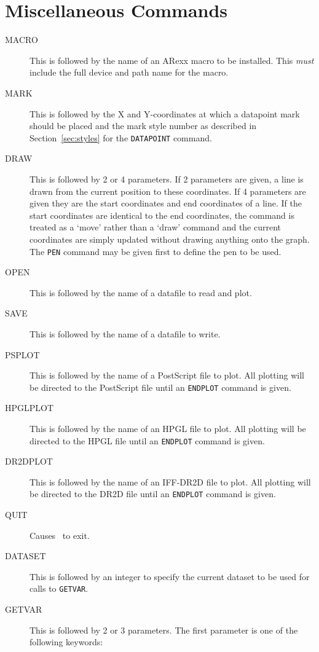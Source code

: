 \section{Miscellaneous Commands}
\begin{description}
\item[MACRO\ddag] This is followed by the name of an ARexx macro to be installed.
This {\em must\/} include the full device and path name for the macro.
\item[MARK\dag] This is followed by the X and Y-coordinates at which a datapoint mark 
should be placed and the mark style number as described in Section~\ref{sec:styles} 
for the {\tt DATAPOINT} command.
\item[DRAW\dag] This is followed by 2 or 4 parameters. If 2 parameters are given,
a line is 
drawn from the current position to these coordinates. If 4 parameters are given they 
are the start coordinates and end coordinates of a line. If the start coordinates 
are identical to the end coordinates, the command is treated as a `move' rather than 
a `draw' command and the current coordinates are simply updated without drawing 
anything onto the graph. The {\tt PEN} command may be given first to define the pen 
to be used.
\item[OPEN\dag] This is followed by the name of a datafile to read and plot.
\item[SAVE\dag] This is followed by the name of a datafile to write.
\item[PSPLOT\dag] This is followed by the name of  a PostScript file to plot. All 
plotting will be directed to the PostScript file until an {\tt ENDPLOT} command is 
given.
\item[HPGLPLOT\dag] This is followed by the name of an HPGL file to plot. All 
plotting will be directed to the HPGL file until an {\tt ENDPLOT} command is 
given.
\item[DR2DPLOT\dag] This is followed by the name of an IFF-DR2D file to plot. All 
plotting will be directed to the DR2D file until an {\tt ENDPLOT} command is 
given.
\item[QUIT\dag] Causes \amplot\ to exit.
\item[DATASET\dag] This is followed by an integer to specify the current dataset to 
be used for calls to {\tt GETVAR}. 
\item[GETVAR\dag] This is followed by 2 or 3 parameters. The first parameter is one 
of the following keywords:
   \begin{center}
   \begin{tabular}{ll}

\end{tabular}
\end{center}
\end{description}
